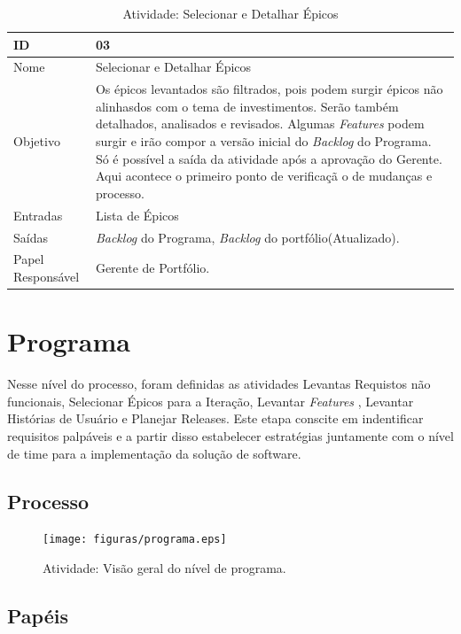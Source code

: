   \begin{table}[H]
    \centering
      \begin{tabular}{| m{5em} | m{10cm} |}
        \hline
        ID       & 03   \\ \hline
        Nome     & Selecionar e Detalhar Épicos   \\ \hline
        Objetivo & Os épicos levantados são filtrados, pois podem surgir épicos não alinhasdos com o tema de investimentos. Serão também detalhados, analisados e revisados. Algumas \textit{Features}  podem surgir e irão compor a versão inicial do \textit{Backlog} do Programa. Só é possível a saída da atividade após a aprovação do Gerente. Aqui acontece o primeiro ponto de verificaçã o de mudanças e processo. \\ \hline
        Entradas & Lista de Épicos   \\ \hline
        Saídas   & \textit{Backlog} do Programa, \textit{Backlog} do portfólio(Atualizado). \\ \hline
        Papel Responsável   & Gerente de Portfólio. \\ \hline
      \end{tabular}
      \caption{Atividade: Selecionar e Detalhar Épicos}
      \label{tabela:atividade3}
  \end{table}

  \section{Programa}

  Nesse nível do processo, foram definidas as atividades Levantas Requistos não funcionais,
  Selecionar Épicos para a Iteração, Levantar \textit{Features} , Levantar Histórias de Usuário e Planejar Releases.
  Este etapa conscite em indentificar requisitos palpáveis e a partir disso estabelecer estratégias
  juntamente com o nível de time para a implementação da solução de software.

  \subsection{Processo}

  \begin{figure}[H]
      \centering
    \texttt{[image: figuras/programa.eps]}
      \caption{Atividade: Visão geral do nível de programa.}
      \label{fig:progama}
  \end{figure}

  \subsection{Papéis}

